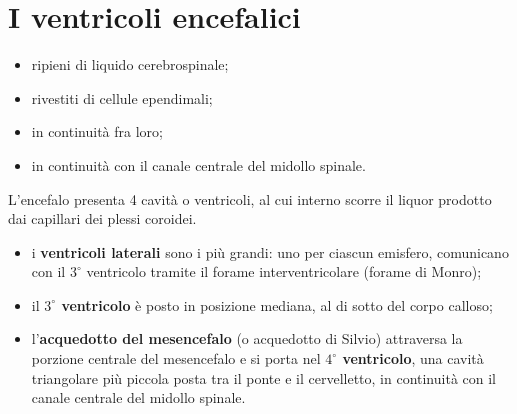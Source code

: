 \section{I ventricoli encefalici}

\begin{itemize}
  \item ripieni di liquido cerebrospinale;
  \item rivestiti di cellule ependimali;
  \item in continuità fra loro;
  \item in continuità con il canale centrale del midollo spinale.
\end{itemize}

L'encefalo presenta 4 cavità o ventricoli, al cui interno scorre il liquor
prodotto dai capillari dei plessi coroidei.
\begin{itemize}
  \item i \textbf{ventricoli laterali} sono i più grandi: uno per ciascun
    emisfero, comunicano con il $3^\circ$ ventricolo tramite il forame
    interventricolare (forame di Monro);
  \item il \textbf{$3^\circ$ ventricolo} è posto in posizione mediana, al di
    sotto del corpo calloso;
  \item l'\textbf{acquedotto del mesencefalo} (o acquedotto di Silvio)
    attraversa la porzione centrale del mesencefalo e si porta nel
    \textbf{$4^\circ$ ventricolo}, una cavità triangolare più piccola posta
    tra il ponte e il cervelletto, in continuità con il canale centrale del
    midollo spinale.
\end{itemize}
